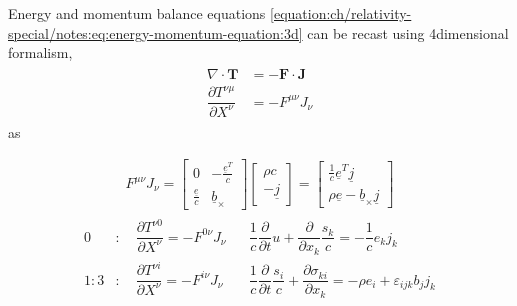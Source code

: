 \documentclass[letterpaper,10pt,english]{jupyterBook}
\begin{document}
\sphinxAtStartPar
Energy and momentum balance equations \eqref{equation:ch/relativity-special/notes:eq:energy-momentum-equation:3d} can be recast using 4\sphinxhyphen{}dimensional formalism,
\begin{equation*}
\begin{split}\begin{aligned}
  \nabla \cdot \mathbf{T} & = - \mathbf{F} \cdot \mathbf{J}  \\
  \dfrac{\partial T^{\nu \mu} }{\partial X^{\nu}} & = - F^{\mu \nu} J_{\nu}
\end{aligned}\end{split}
\end{equation*}
\sphinxAtStartPar
as




\begin{equation*}
\begin{split}F^{\mu \nu} J_{\nu} = \begin{bmatrix} 0 &  -\frac{\underline{e}^T}{c} \\ \frac{\underline{e}}{c} & \underline{b}_{\times} \end{bmatrix} \begin{bmatrix} \rho c \\ - \underline{j} \end{bmatrix} = \begin{bmatrix} \frac{1}{c} \underline{e}^T \underline{j} \\ \rho \underline{e} - \underline{b}_\times \underline{j} \end{bmatrix}\end{split}
\end{equation*}\begin{equation*}
\begin{split}\begin{aligned}
  0   & : \quad \dfrac{\partial T^{\nu 0}}{\partial X^{\nu}} = - F^{0 \nu} J_{\nu} && \dfrac{1}{c}\dfrac{\partial}{\partial t} u + \dfrac{\partial}{\partial x_k} \dfrac{s_k}{c} = - \dfrac{1}{c} e_k j_k \\
  1:3 & : \quad \dfrac{\partial T^{\nu i}}{\partial X^{\nu}} = - F^{i \nu} J_{\nu} && \dfrac{1}{c}\dfrac{\partial}{\partial t} \dfrac{s_i}{c} + \dfrac{\partial \sigma_{ki}}{\partial x_k} = - \rho e_i + \varepsilon_{ijk} b_j j_k  \\
\end{aligned}\end{split}
\end{equation*}
\end{document}
